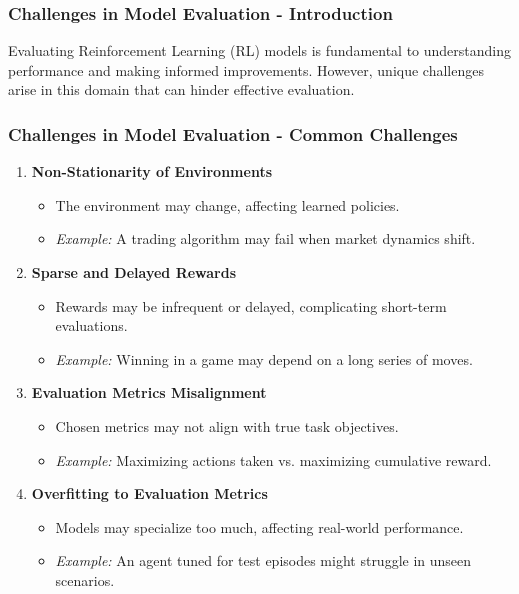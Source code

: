\documentclass{beamer}
\begin{document}
\begin{frame}[fragile]
    \frametitle{Challenges in Model Evaluation - Introduction}
    Evaluating Reinforcement Learning (RL) models is fundamental to understanding performance and making informed improvements. However, unique challenges arise in this domain that can hinder effective evaluation.
\end{frame}

\begin{frame}[fragile]
    \frametitle{Challenges in Model Evaluation - Common Challenges}
    \begin{enumerate}
        \item \textbf{Non-Stationarity of Environments}
        \begin{itemize}
            \item The environment may change, affecting learned policies.
            \item \textit{Example:} A trading algorithm may fail when market dynamics shift.
        \end{itemize}

        \item \textbf{Sparse and Delayed Rewards}
        \begin{itemize}
            \item Rewards may be infrequent or delayed, complicating short-term evaluations.
            \item \textit{Example:} Winning in a game may depend on a long series of moves.
        \end{itemize}

        \item \textbf{Evaluation Metrics Misalignment}
        \begin{itemize}
            \item Chosen metrics may not align with true task objectives.
            \item \textit{Example:} Maximizing actions taken vs. maximizing cumulative reward.
        \end{itemize}

        \item \textbf{Overfitting to Evaluation Metrics}
        \begin{itemize}
            \item Models may specialize too much, affecting real-world performance.
            \item \textit{Example:} An agent tuned for test episodes might struggle in unseen scenarios.
        \end{itemize}


\end{enumerate}
\end{frame}
\end{document}
